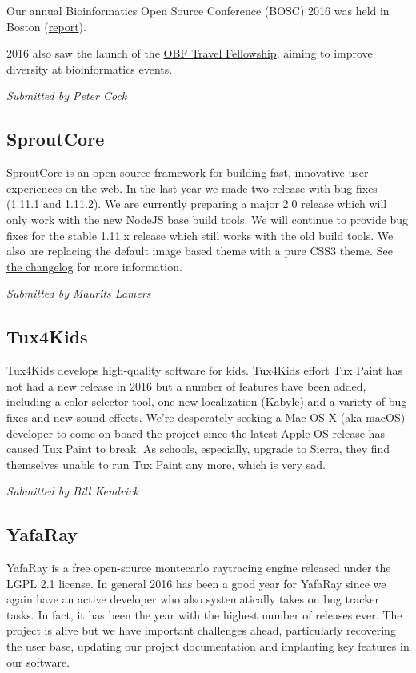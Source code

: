 \documentclass[letterpaper]{report}
\begin{document}
Our annual Bioinformatics Open Source Conference (BOSC) 2016 was held in
Boston (\href{http://dx.doi.org/10.12688/f1000research.9663.1}{report}).

2016 also saw the launch of the
\href{https://news.open-bio.org/2016/03/01/obf-travel-fellowship-program/}{OBF
Travel Fellowship}, aiming to improve diversity at bioinformatics
events.

{\em Submitted by Peter Cock}

\subsection{SproutCore}

SproutCore is an open source framework for building fast, innovative
user experiences on the web. In the last year we made two release with
bug fixes (1.11.1 and 1.11.2). We are currently preparing a major 2.0
release which will only work with the new NodeJS base build tools. We
will continue to provide bug fixes for the stable 1.11.x release which
still works with the old build tools. We also are replacing the default
image based theme with a pure CSS3 theme.  See
\href{https://github.com/sproutcore/sproutcore/blob/master/CHANGELOG.md}{the
changelog} for more information.

{\em Submitted by Maurits Lamers}

\subsection{Tux4Kids}

Tux4Kids develops high-quality software for kids.  Tux4Kids effort Tux
Paint has not had a new release in 2016 but a number of features have
been added, including a color selector tool, one new localization
(Kabyle) and a variety of bug fixes and new sound effects.  We're
desperately seeking a Mac OS X (aka macOS) developer to come on board
the project since the latest Apple OS release has caused Tux Paint to
break.  As schools, especially, upgrade to Sierra, they find themselves
unable to run Tux Paint any more, which is very sad.

{\em Submitted by Bill Kendrick}

\subsection{YafaRay}

YafaRay is a free open-source montecarlo raytracing engine released
under the LGPL 2.1 license.  In general 2016 has been a good year for
YafaRay since we again have an active developer who also systematically
takes on bug tracker tasks.  In fact, it has been the year with the
highest number of releases ever. The project is alive but we have
important challenges ahead, particularly recovering the user base,
updating our project documentation and implanting key features in our
software.
\end{document}
